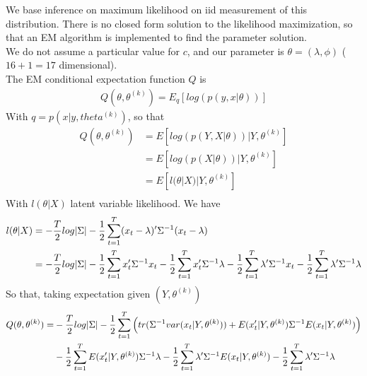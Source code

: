 \documentclass[twoside]{article}
\begin{document}
We base inference on maximum likelihood on iid measurement of this distribution. There is no closed form solution to the likelihood maximization, so that an EM algorithm is implemented to find the parameter solution.\\

We do not assume a particular value for $c$, and our parameter is $\theta = \left(\lambda, \phi\right)$ ($16 + 1 = 17$ dimensional).\\

The EM conditional expectation function $Q$ is
\begin{align*}
Q(\theta, \theta^{(k)}) = E_q \left[ log\left(p(y, x | \theta) \right) \right]
\end{align*}
With $q = p(x | y, theta^{(k)})$, so that
\begin{align*}
Q(\theta, \theta^{(k)}) & = E \left[ log\left(p(Y, X | \theta)\right) | Y, \theta^{(k)} \right]\\
& = E \left[ log\left(p(X | \theta)\right) | Y, \theta^{(k)} \right]\\
& = E \left[ l(\theta|X) | Y, \theta^{(k)} \right]\\
\end{align*}
With $l(\theta|X)$ latent variable likelihood. We have
\begin{align*}
l(\theta | X) & = - \frac{T}{2} \* log|\Sigma| - \frac{1}{2	} \* \sum_{t=1}^{T} (x_t - \lambda)' \* \Sigma^{-1} \* (x_t - \lambda)\\
& = - \frac{T}{2} \* log|\Sigma| - \frac{1}{2} \* \sum_{t=1}^{T} x_t' \* \Sigma^{-1} \* x_t - \frac{1}{2} \* \sum_{t=1}^{T} x_t' \* \Sigma^{-1} \* \lambda - \frac{1}{2} \* \sum_{t=1}^{T}  \lambda' \* \Sigma^{-1} \* x_t - \frac{1}{2	} \* \sum_{t=1}^{T} \lambda' \* \Sigma^{-1} \* \lambda\\
\end{align*}
So that, taking expectation given $(Y, \theta^{(k)})$
\begin{align*}
Q(\theta, \theta^{(k)}) = & - \frac{T}{2} \* log|\Sigma| - \frac{1}{2} \* \sum_{t=1}^{T} \left( tr(\Sigma^{-1} \* var(x_t| Y, \theta^{(k)})) + E(x_t' | Y, \theta^{(k)}) \* \Sigma^{-1} \* E(x_t | Y, \theta^{(k)}) \right) \\
& - \frac{1}{2} \* \sum_{t=1}^{T} E(x_t' | Y, \theta^{(k)}) \* \Sigma^{-1} \* \lambda - \frac{1}{2} \* \sum_{t=1}^{T}  \lambda' \* \Sigma^{-1} \* E(x_t | Y, \theta^{(k)}) - \frac{1}{2	} \* \sum_{t=1}^{T} \lambda' \* \Sigma^{-1} \* \lambda\\
\end{align*}
\end{document}
